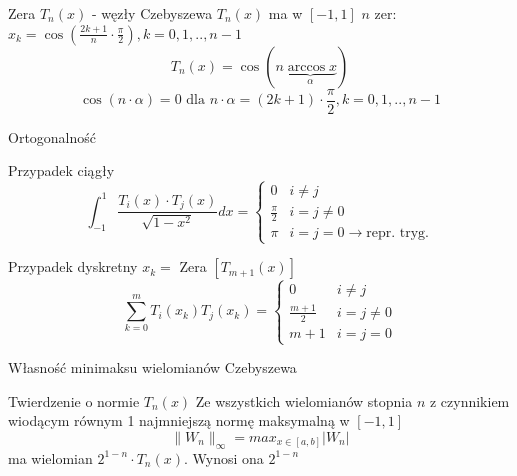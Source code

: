 \begin{frame}{Zera $T_n(x)$ - węzły Czebyszewa}
	$T_n(x)$ ma w $[-1,1]$ $n$ zer:\newline
    $x_k = \cos (\frac{2k+1}{n} \cdot \frac{\pi}{2}), k=0,1,..,n-1$
    $$T_n(x) = \cos(n \underbrace{\arccos x}_\alpha)$$
    $$\cos(n \cdot \alpha) = 0 \text{ dla } n \cdot \alpha = (2k+1) \cdot \frac{\pi}{2},k=0,1,..,n-1$$
\end{frame}
\begin{frame}{Ortogonalność}
	\begin{block}{Przypadek ciągły}
		$$\int_{-1}^{1}\frac{T_i(x) \cdot T_j(x)}{\sqrt{1-x^2}}dx = \left\{\begin{array}{lc}
			0 & i \not= j \\
            \frac{\pi}{2} & i = j \not= 0 \\
            \pi & i = j = 0 \rightarrow \text{repr. tryg.}
		\end{array}\right.$$
	\end{block}
    
    \begin{block}{Przypadek dyskretny $x_k = $ Zera $[T_{m+1}(x)]$}
    $$\sum_{k=0}^{m}T_i(x_k)T_j(x_k) = \left\{\begin{array}{rc}
    	0 & i \not= j \\
        \frac{m+1}{2} & i=j \not= 0 \\
        m+1 & i=j=0
    \end{array}\right.$$
    \end{block}
\end{frame}
\begin{frame}{Własność minimaksu wielomianów Czebyszewa}
	\begin{block}{Twierdzenie o normie $T_n(x)$}
		Ze wszystkich wielomianów stopnia $n$ z czynnikiem wiodącym równym 1 najmniejszą normę maksymalną w $[-1,1]$ 
        $$\lVert W_n \rVert _{\infty} = max_{x \in [a,b]}|W_n|$$
        ma wielomian $2^{1-n} \cdot T_n(x)$. Wynosi ona $2^{1-n}$
	\end{block}
\end{frame}
